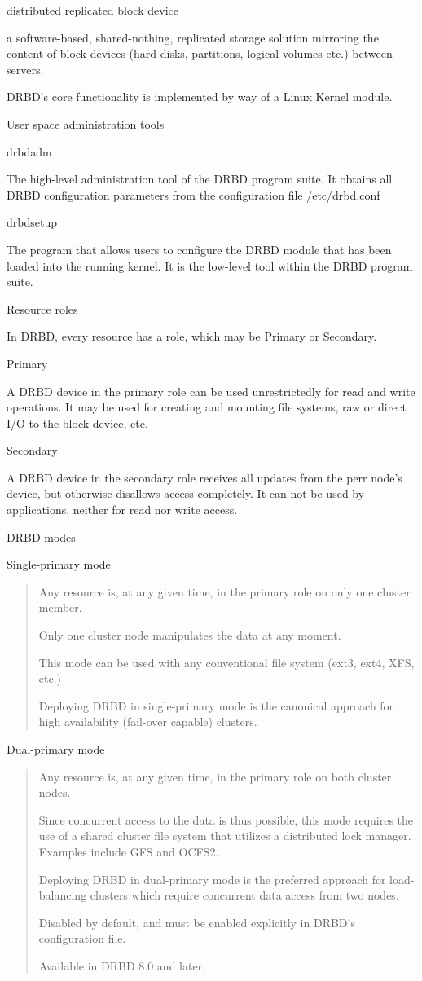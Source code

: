 distributed replicated block device

a software-based, shared-nothing, replicated storage solution
mirroring the content of block devices (hard disks, partitions,
logical volumes etc.) between servers.

DRBD's core functionality is implemented by way of a Linux Kernel
module.

User space administration tools

drbdadm

The high-level administration tool of the DRBD program suite. It
obtains all DRBD configuration parameters from the configuration 
file /etc/drbd.conf

drbdsetup

The program that allows users to configure the DRBD module that has
been loaded into the running kernel. It is the low-level tool within
the DRBD program suite.

Resource roles

In DRBD, every resource has a role, which may be Primary or Secondary.

Primary

A DRBD device in the primary role can be used unrestrictedly for read
and write operations. It may be used for creating and mounting file
systems, raw or direct I/O to the block device, etc.

Secondary

A DRBD device in the secondary role receives all updates from the perr
node's device, but otherwise disallows access completely.  It can not
be used by applications, neither for read nor write access.

DRBD modes

Single-primary mode
\begin{quote}
Any resource is, at any given time, in the primary role on only one
cluster member.

Only one cluster node manipulates the data at any moment.

This mode can be used with any conventional file system (ext3, ext4,
XFS, etc.)

Deploying DRBD in single-primary mode is the canonical approach for
high availability (fail-over capable) clusters.
\end{quote}

Dual-primary mode
\begin{quote}
Any resource is, at any given time, in the primary role on both
cluster nodes.

Since concurrent access to the data is thus possible, this mode
requires the use of a shared cluster file system that utilizes a
distributed lock manager. Examples include GFS and OCFS2.

Deploying DRBD in dual-primary mode is the preferred approach for
load-balancing clusters which require concurrent data access from two
nodes.

Disabled by default, and must be enabled explicitly in DRBD's
configuration file.

Available in DRBD 8.0 and later.
\end{quote}
 
